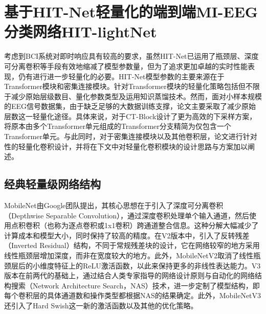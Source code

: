 \section{基于HIT-Net轻量化的端到端MI-EEG分类网络HIT-lightNet}

考虑到BCI系统对即时响应具有较高的要求，虽然HIT-Net已运用了瓶颈层、深度可分离卷积等手段有效地缩减了模型参数量，但为了追求更加卓越的实时性能表现，仍有进行进一步轻量化的必要。HIT-Net模型参数的主要来源在于Transformer模块和密集连接模块。针对Transformer模块的轻量化策略包括但不限于减少原始层级数目、量化参数类型及运用知识蒸馏技术。然而，面对小样本规模的EEG信号数据集，由于缺乏足够的大数据训练支撑，论文主要采取了减少原始层数这一轻量化途径。具体来说，对于CT-Block设计了更为高效的下采样方案，将原本由多个Transformer单元组成的Transformer分支精简为仅包含一个Transformer单元。与此同时，对于密集连接模块以及其他卷积层，论文进行针对性的轻量化卷积设计，并将在下文中对轻量化卷积模块的设计思路与方案加以阐述。

\subsection{经典轻量级网络结构}

MobileNet由Google团队提出，其核心思想在于引入了深度可分离卷积（Depthwise Separable Convolution）\cite{howard2017mobilenets}，通过深度卷积处理单个输入通道，然后使用点积卷积（也称为逐点卷积或1x1卷积）跨通道整合信息。这种分解大幅减少了计算成本和模型大小，同时保持了较高的精度。在V2版本中，引入了反转残差（Inverted Residual）结构\cite{sandler2018mobilenetv2}，不同于常规残差块的设计，它在网络较窄的地方采用线性瓶颈层增加深度，而非在宽度较大的地方。此外，MobileNetV2取消了线性瓶颈层后的小维度特征上的ReLU激活函数，以此来保持更多的非线性表达能力。V3版本在前两代的基础上，通过结合人类专家指导的网络设计原则与自动化的网络结构搜索（Network Architecture Search，NAS）技术\cite{howard2019searching}，进一步定制了模型结构，即每个卷积层的具体通道数和操作类型都根据NAS的结果确定。此外，MobileNetV3还引入了Hard Swish这一新的激活函数以及其他的优化策略。

